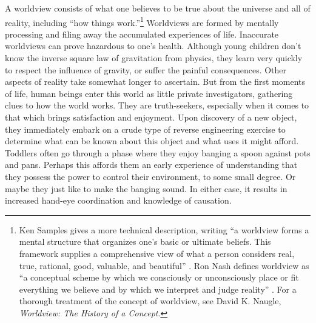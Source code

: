 A worldview consists of what one believes to be true about the universe
and all of reality, including “how things work.”\footnote{Ken Samples gives a more technical description,
writing “a worldview forms a mental structure that organizes one’s
basic or ultimate beliefs. This framework supplies a comprehensive view
of what a person considers real, true, rational, good, valuable, and
beautiful” \citep{samples2007}.
Ron Nash defines worldview as “a conceptual scheme by
which we consciously or unconsciously place or fit everything we
believe and by which we interpret and judge reality” \citep[][pg. 24]{nash1988}.
For a thorough treatment of the concept
of worldview, see David K. Naugle, \textit{Worldview: The History of a
Concept}.\citep{naugle2002}
} 
Worldviews are formed by mentally processing and filing away the
accumulated experiences of life. Inaccurate worldviews can prove
hazardous to one’s health. Although young children don’t know the
inverse square law of gravitation from physics, they learn very quickly
to respect the influence of gravity, or suffer the painful
consequences. Other aspects of reality take somewhat longer to
ascertain. But from the first moments of life, human beings enter this
world as little private investigators, gathering clues to how the world
works. They are truth-seekers, especially when it comes to that which
brings satisfaction and enjoyment. Upon discovery of a new object, they
immediately embark on a crude type of reverse engineering exercise to
determine what can be known about this object and what uses it might
afford. Toddlers often go through a phase where they enjoy banging a
spoon against pots and pans. Perhaps this affords them an early
experience of understanding that they possess the power to control
their environment, to some small degree. Or maybe they just like to
make the banging sound. In either case, it results in increased
hand-eye coordination and knowledge of causation.

